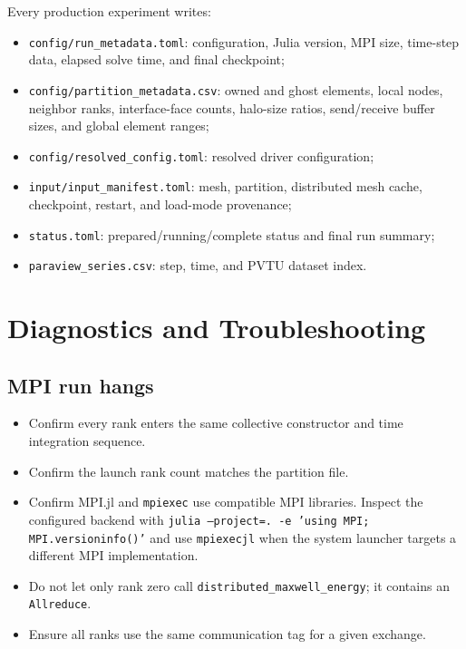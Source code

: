 \documentclass[11pt,oneside]{book}
\newcommand{\code}[1]{\texttt{#1}}
\begin{document}
Every production experiment writes:

\begin{itemize}[leftmargin=*]
  \item \code{config/run\_metadata.toml}: configuration, Julia version, MPI
        size, time-step data, elapsed solve time, and final checkpoint;
  \item \code{config/partition\_metadata.csv}: owned and ghost elements, local
        nodes, neighbor ranks, interface-face counts, halo-size ratios,
        send/receive buffer sizes, and global element ranges;
  \item \code{config/resolved\_config.toml}: resolved driver configuration;
  \item \code{input/input\_manifest.toml}: mesh, partition, distributed mesh
        cache, checkpoint, restart, and load-mode provenance;
  \item \code{status.toml}: prepared/running/complete status and final run
        summary;
  \item \code{paraview\_series.csv}: step, time, and PVTU dataset index.
\end{itemize}

\chapter{Diagnostics and Troubleshooting}

\section{MPI run hangs}

\begin{itemize}[leftmargin=*]
  \item Confirm every rank enters the same collective constructor and time
        integration sequence.
  \item Confirm the launch rank count matches the partition file.
  \item Confirm MPI.jl and \code{mpiexec} use compatible MPI libraries.
        Inspect the configured backend with
        \code{julia --project=. -e 'using MPI; MPI.versioninfo()'} and use
        \code{mpiexecjl} when the system launcher targets a different MPI
        implementation.
  \item Do not let only rank zero call \code{distributed\_maxwell\_energy};
        it contains an \code{Allreduce}.
  \item Ensure all ranks use the same communication tag for a given exchange.
\end{itemize}
\end{document}
